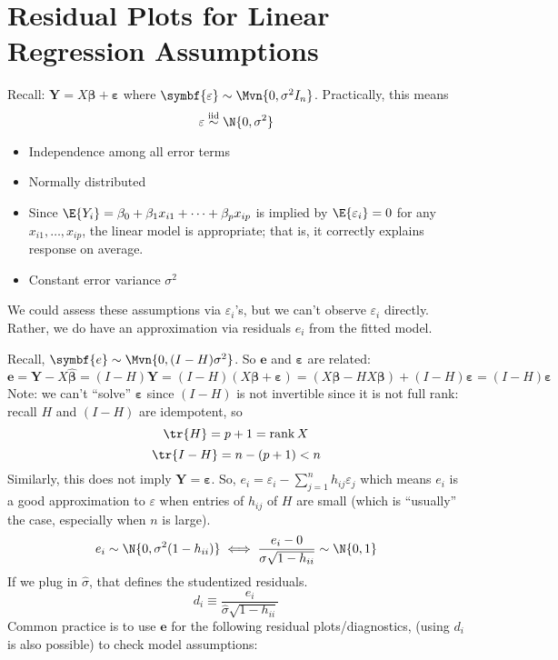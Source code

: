 \section{Residual Plots for Linear Regression Assumptions}

Recall: $ \symbf{Y}=X \symbf{\beta}+\symbf{\varepsilon} $
where $ \symbf{\varepsilon}\sim \Mvn{0,\sigma^2I_{n}} $.
Practically, this means
\[ \varepsilon \stackrel{\text{iid}}{\sim}\N{0,\sigma^2} \]
\begin{itemize}
      \item Independence among all error terms
      \item Normally distributed
      \item Since $ \E{Y_i}=\beta_0+\beta_1x_{i1}+\cdots+\beta_p x_{ip} $
            is implied by $ \E{\varepsilon_i}=0 $ for any
            $ x_{i1},\ldots,x_{ip} $, the linear model
            is appropriate; that is, it correctly explains response
            on average.
      \item Constant error variance $ \sigma^2 $
\end{itemize}
We could assess these assumptions
via $ \varepsilon_i $'s, but we can't observe
$ \varepsilon_i $ directly. Rather, we do have an approximation
via residuals $ e_i $ from the fitted model.

Recall, $ \symbf{e}\sim \Mvn{0,(I-H)\sigma^2} $.
So $ \symbf{e} $ and $ \symbf{\varepsilon} $ are related:
\[ \symbf{e}=\symbf{Y}-X \hat{\symbf{\beta}}=(I-H)\symbf{Y}=
      (I-H)(X \symbf{\beta}+\symbf{\varepsilon})=
      (X \symbf{\beta}-H X\symbf{\beta})+(I-H)\symbf{\varepsilon}=
      (I-H)\symbf{\varepsilon} \]
Note: we can't ``solve'' $ \symbf{\varepsilon} $
since $ (I-H) $ is not invertible since it is not full rank:
recall $ H $ and $ (I-H) $ are idempotent, so
\[ \tr{H}=p+1=\rank{X} \]
\[ \tr{I-H}=n-(p+1)<n \]
Similarly, this does not imply $ \symbf{Y}=\symbf{\varepsilon} $.
So, $ e_i=\varepsilon_i-\sum_{j=1}^{n} h_{ij}\varepsilon_j $
which means $ e_i $ is a good approximation to $ \varepsilon $
when entries of $ h_{ij} $ of $ H $ are small
(which is ``usually'' the case, especially when $ n $ is large).
\[ e_i \sim \N{0,\sigma^2(1-h_{ii})}\iff
      \frac{e_i-0}{\sigma\sqrt{1-h_{ii}}} \sim \N{0,1} \]
If we plug in $ \hat{\sigma} $, that defines
the studentized residuals.
\[ d_i\equiv \frac{e_i}{\hat{\sigma}\sqrt{1-h_{ii}}}  \]
Common practice is to use $ \symbf{e} $ for
the following residual plots/diagnostics,
(using $ d_i $ is also possible) to check model assumptions:

